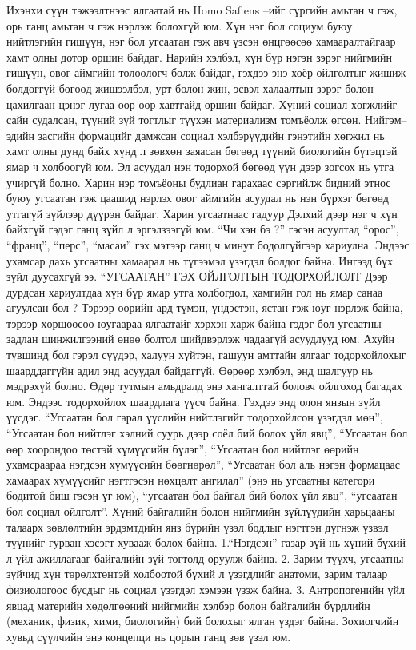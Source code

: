 Ихэнхи сүүн тэжээлтнээс ялгаатай нь Homo Safiens –ийг сүргийн амьтан ч гэж, орь ганц амьтан ч гэж нэрлэж болохгүй юм. Хүн нэг бол социум буюу нийтлэгийн гишүүн, нэг бол угсаатан гэж авч үзсэн өнцгөөсөө хамааралтайгаар хамт олны дотор оршин байдаг. Нарийн хэлбэл, хүн бүр нэгэн зэрэг нийгмийн гишүүн, овог аймгийн төлөөлөгч болж байдаг, гэхдээ энэ хоёр ойлголтыг жишиж болдоггүй бөгөөд жишээлбэл, урт болон жин, эсвэл халаалтын зэрэг болон цахилгаан цэнэг лугаа өөр өөр хавтгайд оршин байдаг.
Хүний социал хөгжлийг сайн судалсан, түүний зүй тогтлыг түүхэн материализм томъёолж өгсөн. Нийгэм–эдийн засгийн формацийг дамжсан социал хэлбэрүүдийн гэнэтийн хөгжил нь хамт олны дунд байх хүнд л зөвхөн заяасан бөгөөд түүний биологийн бүтэцтэй ямар ч холбоогүй юм. Эл асуудал нэн тодорхой бөгөөд үүн дээр зогсох нь утга учиргүй болно. Харин нэр томъёоны будлиан гарахаас сэргийлж бидний этнос буюу угсаатан гэж цаашид нэрлэх овог аймгийн асуудал нь нэн бүрхэг бөгөөд утгагүй зүйлээр дүүрэн байдаг. Харин угсаатнаас гадуур Дэлхий дээр нэг ч хүн байхгүй гэдэг ганц зүйл л эргэлзээгүй юм. “Чи хэн бэ ?” гэсэн асуултад “орос”, “франц”, “перс”, “масаи” гэх мэтээр ганц ч минут бодолгүйгээр хариулна. Эндээс ухамсар дахь угсаатны хамаарал нь түгээмэл үзэгдэл болдог байна. Ингээд бүх зүйл дуусахгүй ээ.
“УГСААТАН” ГЭХ ОЙЛГОЛТЫН ТОДОРХОЙЛОЛТ
Дээр дурдсан хариултдаа хүн бүр ямар утга холбогдол, хамгийн гол нь ямар санаа агуулсан бол ? Тэрээр өөрийн ард түмэн, үндэстэн, ястан гэж юуг нэрлэж байна, тэрээр хөршөөсөө юугаараа ялгаатайг хэрхэн харж байна гэдэг бол угсаатны задлан шинжилгээний өнөө болтол шийдвэрлэж чадаагүй асуудлууд юм. Ахуйн түвшинд бол гэрэл сүүдэр, халуун хүйтэн, гашуун амттайн ялгааг тодорхойлохыг шаарддаггүйн адил энд асуудал байдаггүй. Өөрөөр хэлбэл, энд шалгуур нь мэдрэхүй болно. Өдөр тутмын амьдралд энэ хангалттай боловч ойлгоход багадах юм. Эндээс тодорхойлох шаардлага үүсч байна. Гэхдээ энд олон янзын зүйл үүсдэг. “Угсаатан бол гарал үүслийн нийтлэгийг тодорхойлсон үзэгдэл мөн”, “Угсаатан бол нийтлэг хэлний суурь дээр соёл бий болох үйл явц”, “Угсаатан бол өөр хоорондоо төстэй хүмүүсийн бүлэг”, “Угсаатан бол нийтлэг өөрийн ухамсраараа нэгдсэн хүмүүсийн бөөгнөрөл”, “Угсаатан бол аль нэгэн формацаас хамаарах хүмүүсийг нэгтгэсэн нөхцөлт ангилал” (энэ нь угсаатны категори бодитой биш гэсэн үг юм), “угсаатан бол байгал бий болох үйл явц”, “угсаатан бол социал ойлголт”.
Хүний байгалийн болон нийгмийн зүйлүүдийн харьцааны талаарх зөвлөлтийн эрдэмтдийн янз бүрийн үзэл бодлыг нэгтгэн дүгнэж үзвэл түүнийг гурван хэсэгт хувааж болох байна. 1.“Нэгдсэн” газар зүй нь хүний бүхий л үйл ажиллагааг байгалийн зүй тогтолд оруулж байна. 2. Зарим түүхч, угсаатны зүйчид хүн төрөлхтөнтэй холбоотой бүхий л үзэгдлийг анатоми, зарим талаар физиологоос бусдыг нь социал үзэгдэл хэмээн үзэж байна. 3. Антропогенийн үйл явцад материйн хөдөлгөөний нийгмийн хэлбэр болон байгалийн бүрдлийн (механик, физик, хими, биологийн) бий болохыг ялган үздэг байна. Зохиогчийн хувьд сүүлчийн энэ концепци нь цорын ганц зөв үзэл юм.
